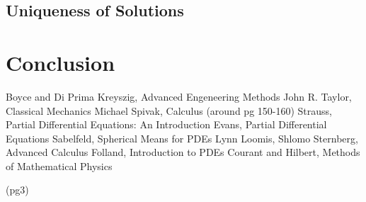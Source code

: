 \documentclass[12pt]{article}
\numberwithin{equation}{section}
\begin{document}
\subsection{Uniqueness of Solutions}

\section{Conclusion}

\begin{thebibliography}{99}
 Boyce and Di Prima 
 Kreyszig, Advanced Engeneering Methods
 John R. Taylor, Classical Mechanics
 Michael Spivak, Calculus (around pg 150-160)
 Strauss, Partial Differential Equations: An Introduction
 Evans, Partial Differential Equations
 Sabelfeld, Spherical Means for PDEs
 Lynn Loomis, Shlomo Sternberg, Advanced Calculus
 Folland, Introduction to PDEs
 Courant and Hilbert, Methods of Mathematical Physics
\end{thebibliography} (pg3)
\end{document}
